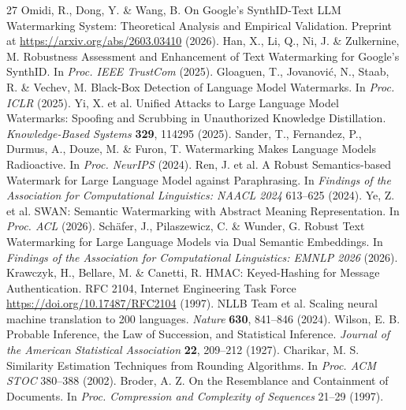 \begin{thebibliography}{27}
 Omidi, R., Dong, Y. \& Wang, B. On Google's SynthID-Text LLM Watermarking System: Theoretical Analysis and Empirical Validation. Preprint at \url{https://arxiv.org/abs/2603.03410} (2026).
 Han, X., Li, Q., Ni, J. \& Zulkernine, M. Robustness Assessment and Enhancement of Text Watermarking for Google's SynthID. In \emph{Proc. IEEE TrustCom} (2025).
 Gloaguen, T., Jovanovi{\'c}, N., Staab, R. \& Vechev, M. Black-Box Detection of Language Model Watermarks. In \emph{Proc. ICLR} (2025).
 Yi, X. et al. Unified Attacks to Large Language Model Watermarks: Spoofing and Scrubbing in Unauthorized Knowledge Distillation. \emph{Knowledge-Based Systems} \textbf{329}, 114295 (2025).
 Sander, T., Fernandez, P., Durmus, A., Douze, M. \& Furon, T. Watermarking Makes Language Models Radioactive. In \emph{Proc. NeurIPS} (2024).
 Ren, J. et al. A Robust Semantics-based Watermark for Large Language Model against Paraphrasing. In \emph{Findings of the Association for Computational Linguistics: NAACL 2024} 613–625 (2024).
 Ye, Z. et al. SWAN: Semantic Watermarking with Abstract Meaning Representation. In \emph{Proc. ACL} (2026).
 Sch{\"a}fer, J., Pilaszewicz, C. \& Wunder, G. Robust Text Watermarking for Large Language Models via Dual Semantic Embeddings. In \emph{Findings of the Association for Computational Linguistics: EMNLP 2026} (2026).
 Krawczyk, H., Bellare, M. \& Canetti, R. HMAC: Keyed-Hashing for Message Authentication. RFC 2104, Internet Engineering Task Force \url{https://doi.org/10.17487/RFC2104} (1997).
 NLLB Team et al. Scaling neural machine translation to 200 languages. \emph{Nature} \textbf{630}, 841–846 (2024).
 Wilson, E. B. Probable Inference, the Law of Succession, and Statistical Inference. \emph{Journal of the American Statistical Association} \textbf{22}, 209–212 (1927).
 Charikar, M. S. Similarity Estimation Techniques from Rounding Algorithms. In \emph{Proc. ACM STOC} 380–388 (2002).
 Broder, A. Z. On the Resemblance and Containment of Documents. In \emph{Proc. Compression and Complexity of Sequences} 21–29 (1997).
\end{thebibliography}
